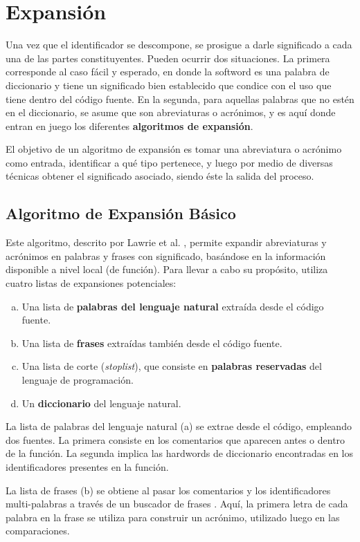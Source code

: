 \section{Expansión}
Una vez que el identificador se descompone, se prosigue a darle significado a cada una de las partes constituyentes.
Pueden ocurrir dos situaciones.
La primera corresponde al caso fácil y esperado, en donde la softword es una palabra de diccionario y tiene un significado bien establecido que condice con el uso que tiene dentro del código fuente.
En la segunda, para aquellas palabras que no estén en el diccionario, se asume que son abreviaturas o acrónimos, y es aquí donde entran en juego los diferentes \textbf{algoritmos de expansión}.

El objetivo de un algoritmo de expansión es tomar una abreviatura o acrónimo como entrada, identificar a qué tipo pertenece, y luego por medio de diversas técnicas obtener el significado asociado, siendo éste la salida del proceso.

\subsection{Algoritmo de Expansión Básico}
Este algoritmo, descrito por Lawrie et al. \cite{Lawrie:2007:EMA:1306878.1307350}, permite expandir abreviaturas y acrónimos en palabras y frases con significado, basándose en la información disponible a nivel local (de función).
Para llevar a cabo su propósito, utiliza cuatro listas de expansiones potenciales:
\begin{enumerate}[(a)]
  \item Una lista de \textbf{palabras del lenguaje natural} extraída desde el código fuente.
  \item Una lista de \textbf{frases} extraídas también desde el código fuente.
  \item Una lista de corte (\textit{stoplist}), que consiste en \textbf{palabras reservadas} del lenguaje de programación.
  \item Un \textbf{diccionario} del lenguaje natural.
\end{enumerate}

La lista de palabras del lenguaje natural (a) se extrae desde el código, empleando dos fuentes.
La primera consiste en los comentarios que aparecen antes o dentro de la función.
La segunda implica las hardwords de diccionario encontradas en los identificadores presentes en la función.

La lista de frases (b) se obtiene al pasar los comentarios y los identificadores multi-palabras a través de un buscador de frases \cite{Feng01}.
Aquí, la primera letra de cada palabra en la frase se utiliza para construir un acrónimo, utilizado luego en las comparaciones.

